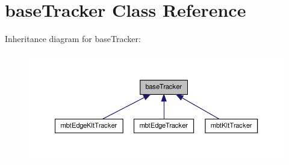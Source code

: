 \hypertarget{classbaseTracker}{\section{base\-Tracker \-Class \-Reference}
\label{classbaseTracker}
}


\-Inheritance diagram for base\-Tracker\-:
\nopagebreak
\begin{figure}[H]
\begin{center}
\leavevmode
\includegraphics[width=350pt]{classbaseTracker__inherit__graph}
\end{center}
\end{figure}
